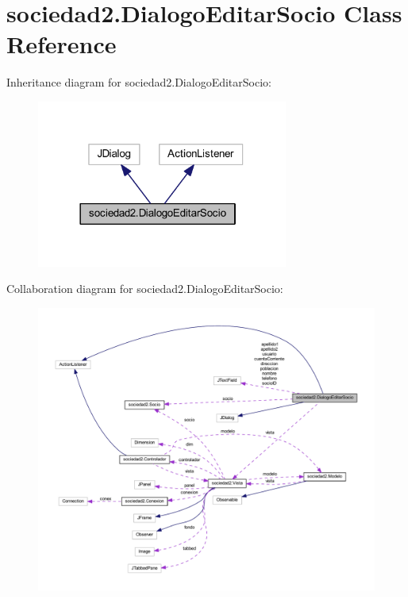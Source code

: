 \hypertarget{classsociedad2_1_1_dialogo_editar_socio}{}\section{sociedad2.\+Dialogo\+Editar\+Socio Class Reference}
\label{classsociedad2_1_1_dialogo_editar_socio}


Inheritance diagram for sociedad2.\+Dialogo\+Editar\+Socio\+:
\nopagebreak
\begin{figure}[H]
\begin{center}
\leavevmode
\includegraphics[width=234pt]{classsociedad2_1_1_dialogo_editar_socio__inherit__graph}
\end{center}
\end{figure}


Collaboration diagram for sociedad2.\+Dialogo\+Editar\+Socio\+:
\nopagebreak
\begin{figure}[H]
\begin{center}
\leavevmode
\includegraphics[width=350pt]{classsociedad2_1_1_dialogo_editar_socio__coll__graph}
\end{center}
\end{figure}
